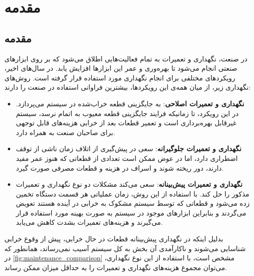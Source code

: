 \chapter{مقدمه}

\section{مقدمه}
در صنعت، نگهداری و تعمیرات به تمام فعالیت‌هایی اطلاق می‌شود که بر روی ابزارهای صنعتی انجام می‌شود تا بهره‌وری و عمر این ابزارها افزایش یابد. در سال‌های اخیر، رویکردهای مختلفی برای انجام نگهداری مورد استفاده قرار گرفته است. روش‌های نگهداری زیر، از میان همه‌ی این رویکردها، بیشترین فراوانی استفاده در صنعت را دارند\cite{zhao2022review}:

\begin{itemize}

\item \textbf{نگهداری و تعمیرات اصلاحی}: به جایگزینی قطعه خراب‌شده در سیستم می‌پردازد. در این رویکرد، تا زمانیکه فرایند جایگزینی قطعه معیوب به اتمام نرسد، سیستم غیرقابل بهره‌برداری است و تعمیر قطعات بعد از خرابی هزینه‌های قابل توجهی برای صاحبان صنعت به همراه دارد\cite{ran2019survey}.

\item \textbf{نگهداری و تعمیرات جلو‌گیرانه}: سعی در پیش‌گیری از اتلاف زمان ناشی از توقف اضطراری دارد، اما در عوض ممکن است تعدادی از قطعاتی که هنوز عمر مفید دارند، دور ریخته شوند و اسراف در هزینه و قطعات مصرفی صورت گیرد\cite{ran2019survey}.

\item \textbf{نگهداری و تعمیرات پیش‌بینانه}: سعی می‌کند مشکلات دو نوع نگهداری و تعمیرات مذکور را حل کند. با استفاده از این روش، زمان عملیاتی هر قسمت دستگاه تخمین زده می‌شود و قطعاتی که توسط سیستم مشکوک به خرابی در آینده هستند تعویض می‌گردند و بنابراین ابزارهای موجود در سیستم به صورت بهینه مورد استفاده قرار می‌گیرند و هزینه‌های تعمیرات بشدت کاهش می‌یابد\cite{zonta2020predictive, ran2019survey}.

\end{itemize}

بدلیل اینکه در نگهداری پیش‌بینانه قطعات در حال خرابی، پیش از وقوع خرابی شناسایی می‌شوند و ناکارآمدی آن بخش به کل سیستم آسیب نمی‌رساند، همانطور که در \cref{fig:maintenance_comparison} مشخص است، با استفاده از این نوع نگهداری، می‌توان مجموع هزینه‌های نگهداری و تعمیرات را به حداقل میزان ممکن رساند\cite{zonta2020predictive}.

